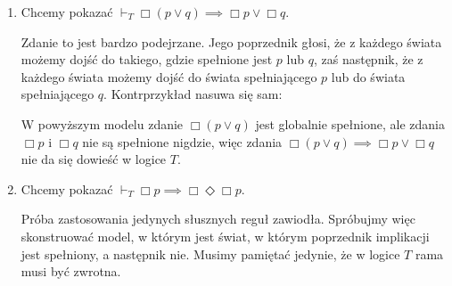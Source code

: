 \documentclass[11pt]{article}
\begin{document}
\begin{enumerate}[label=(\alph*)]
		\item Chcemy pokazać $\vdash_T \Box (p \lor q) \implies \Box p \lor \Box q$.
			
			\par Zdanie to jest bardzo podejrzane. Jego poprzednik głosi, że z każdego świata możemy dojść do takiego, gdzie spełnione jest $p$ lub $q$, zaś następnik, że z każdego świata możemy dojść do świata spełniającego $p$ lub do świata spełniającego $q$. Kontrprzykład nasuwa się sam:
	
		\begin{center}
		\end{center}
			
		\par W powyższym modelu zdanie $\Box (p \lor q)$ jest globalnie spełnione, ale zdania $\Box p$ i $\Box q$ nie są spełnione nigdzie, więc zdania $\Box (p \lor q) \implies \Box p \lor \Box q$ nie da się dowieść w logice $T$.
		
		\item Chcemy pokazać $\vdash_T \Box p \implies \Box\Diamond\Box p$.
		
			\begin{prooftree}				
				
				
				
			\end{prooftree}
			
			\par Próba zastosowania jedynych słusznych reguł zawiodła. Spróbujmy więc skonstruować model, w którym jest świat, w którym poprzednik implikacji jest spełniony, a następnik nie. Musimy pamiętać jedynie, że w logice $T$ rama musi być zwrotna.
		
				\begin{center}
				\begin{tikzpicture}


\end{tikzpicture}
\end{center}
\end{enumerate}
\end{document}
